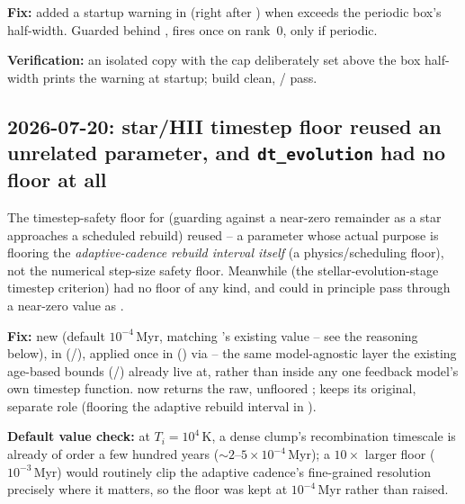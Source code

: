 \textbf{Fix:} added a startup warning in 
(right after ) when
 exceeds the periodic box's
half-width. Guarded behind , fires
once on rank~0, only if periodic.

\textbf{Verification:} an isolated  copy with
the cap deliberately set above the box half-width prints the warning at
startup; build clean, /
 pass.

\subsection[2026-07-20: star/HII timestep floor reused an unrelated
parameter]{2026-07-20: star/HII timestep floor reused an unrelated
parameter, and \texttt{dt\_evolution} had no floor at all}
\label{sec:t16-timestep-floor}

The timestep-safety floor for  (guarding against a
near-zero remainder as a star approaches a scheduled rebuild) reused
 -- a parameter whose actual
purpose is flooring the \emph{adaptive-cadence rebuild interval itself}
(a physics/scheduling floor), not the numerical step-size safety floor.
Meanwhile  (the stellar-evolution-stage timestep
criterion) had no floor of any kind, and could in principle pass
through a near-zero value as .

\textbf{Fix:} new  (default
$10^{-4}\,$Myr, matching 's existing
value -- see the reasoning below), in 
(/), applied once
in 
() via
 -- the same
model-agnostic layer the existing age-based bounds
(/) already live at, rather
than inside any one feedback model's own timestep function.
 now returns the raw,
unfloored ;
 keeps its original, separate role
(flooring the adaptive rebuild interval in
).

\textbf{Default value check:} at $T_i=10^4\,$K, a dense clump's
recombination timescale is already of order a few hundred years
($\sim2$--$5\times10^{-4}\,$Myr); a $10\times$ larger floor
($10^{-3}\,$Myr) would routinely clip the adaptive cadence's
fine-grained resolution precisely where it matters, so the floor was
kept at $10^{-4}\,$Myr rather than raised.

